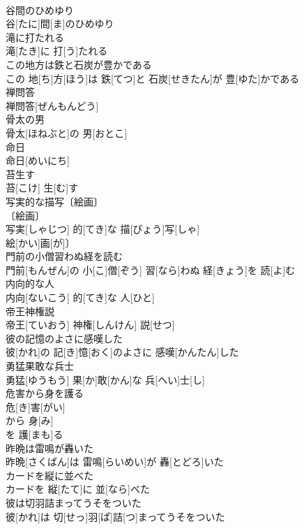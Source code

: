 \documentclass[8pt]{extreport}
\begin{document}
\begin{CJK}{UTF8}{min}
\\	谷間のひめゆり	
\\	谷[たに]間[ま]のひめゆり
\\	滝に打たれる	
\\	滝[たき]に 打[う]たれる
\\	この地方は鉄と石炭が豊かである	
\\	この 地[ち]方[ほう]は 鉄[てつ]と 石炭[せきたん]が 豊[ゆた]かである
\\	禅問答	
\\	禅問答[ぜんもんどう]
\\	骨太の男	
\\	骨太[ほねぶと]の 男[おとこ]
\\	命日	
\\	命日[めいにち]
\\	苔生す	
\\	苔[こけ] 生[む]す
\\	写実的な描写〔絵画〕	
\\	〔絵画〕
\\	写実[しゃじつ] 的[てき]な 描[びょう]写[しゃ]
\\	絵[かい]画[が]〕
\\	門前の小僧習わぬ経を読む	
\\	門前[もんぜん]の 小[こ]僧[ぞう] 習[なら]わぬ 経[きょう]を 読[よ]む
\\	内向的な人	
\\	内向[ないこう] 的[てき]な 人[ひと]
\\	帝王神権説	
\\	帝王[ていおう] 神権[しんけん] 説[せつ]
\\	彼の記憶のよさに感嘆した	
\\	彼[かれ]の 記[き]憶[おく]のよさに 感嘆[かんたん]した
\\	勇猛果敢な兵士	
\\	勇猛[ゆうもう] 果[か]敢[かん]な 兵[へい]士[し]
\\	危害から身を護る	
\\	危[き]害[がい]
\\	から 身[み]
\\	を 護[まも]る 
\\	昨晩は雷鳴が轟いた	
\\	昨晩[さくばん]は 雷鳴[らいめい]が 轟[とどろ]いた
\\	カードを縦に並べた	
\\	カードを 縦[たて]に 並[なら]べた
\\	彼は切羽詰まってうそをついた	
\\	彼[かれ]は 切[せっ]羽[ぱ]詰[つ]まってうそをついた

\end{CJK}
\end{document}
